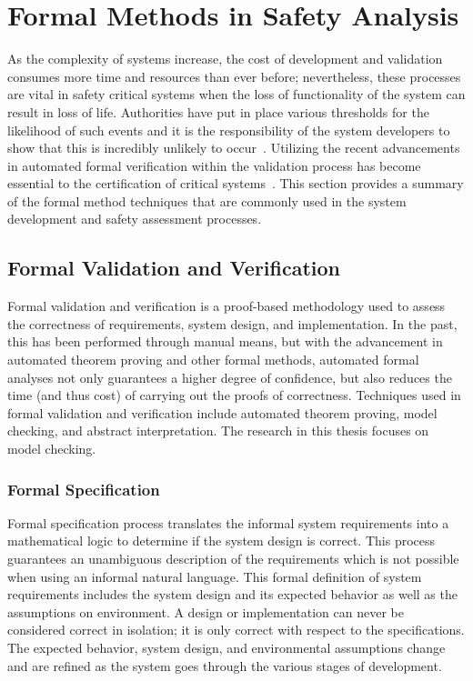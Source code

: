 \section{Formal Methods in Safety Analysis}
\label{sec:formalMethodsSA}
As the complexity of systems increase, the cost of development and validation consumes more time and resources than ever before; nevertheless, these processes are vital in safety critical systems when the loss of functionality of the system can result in loss of life. Authorities have put in place various thresholds for the likelihood of such events and it is the responsibility of the system developers to show that this is incredibly unlikely to occur~\cite{faaSA}. Utilizing the recent advancements in automated formal verification within the validation process has become essential to the certification of critical systems~\cite{deptOfDefense,standard1999,prasad2005survey}. This section provides a summary of the formal method techniques that are commonly used in the system development and safety assessment processes.

\subsection{Formal Validation and Verification}
Formal validation and verification is a proof-based methodology used to assess the correctness of requirements, system design, and implementation. In the past, this has been performed through manual means, but with the advancement in automated theorem proving and other formal methods, automated formal analyses not only guarantees a higher degree of confidence, but also reduces the time (and thus cost) of carrying out the proofs of correctness. Techniques used in formal validation and verification include automated theorem proving, model checking, and abstract interpretation. The research in this thesis focuses on model checking. 

\subsubsection{Formal Specification}
Formal specification process translates the informal system requirements into a mathematical logic to determine if the system design is correct. This process guarantees an unambiguous description of the requirements which is not possible when using an informal natural language. This formal definition of system requirements includes the system design and its expected behavior as well as the assumptions on environment. A design or implementation can never be considered correct in isolation; it is only correct with respect to the specifications. The expected behavior, system design, and environmental assumptions change and are refined as the system goes through the various stages of development. 

